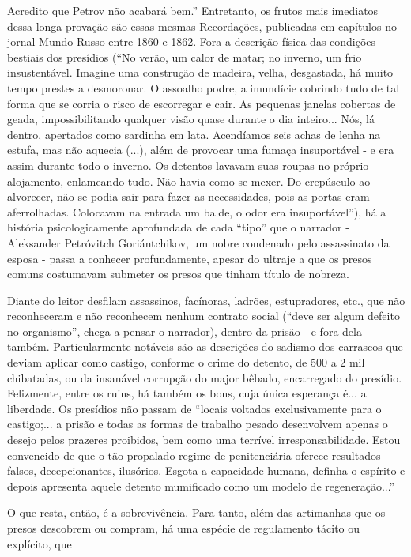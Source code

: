 Acredito que Petrov não acabará bem.'' Entretanto, os frutos mais
imediatos dessa longa provação são essas mesmas Recordações, publicadas
em capítulos no jornal Mundo Russo entre 1860 e 1862. Fora a descrição
física das condições bestiais dos presídios (``No verão, um calor de
matar; no inverno, um frio insustentável. Imagine uma construção de
madeira, velha, desgastada, há muito tempo prestes a desmoronar. O
assoalho podre, a imundície cobrindo tudo de tal forma que se corria o
risco de escorregar e cair. As pequenas janelas cobertas de geada,
impossibilitando qualquer visão quase durante o dia inteiro... Nós, lá
dentro, apertados como sardinha em lata. Acendíamos seis achas de lenha
na estufa, mas não aquecia (...), além de provocar uma fumaça
insuportável - e era assim durante todo o inverno. Os detentos lavavam
suas roupas no próprio alojamento, enlameando tudo. Não havia como se
mexer. Do crepúsculo ao alvorecer, não se podia sair para fazer as
necessidades, pois as portas eram aferrolhadas. Colocavam na entrada um
balde, o odor era insuportável''), há a história psicologicamente
aprofundada de cada ``tipo'' que o narrador - Aleksander Petróvitch
Goriántchikov, um nobre condenado pelo assassinato da esposa - passa a
conhecer profundamente, apesar do ultraje a que os presos comuns
costumavam submeter os presos que tinham título de nobreza.

Diante do leitor desfilam assassinos, facínoras, ladrões, estupradores,
etc., que não reconheceram e não reconhecem nenhum contrato social
(``deve ser algum defeito no organismo'', chega a pensar o narrador),
dentro da prisão - e fora dela também. Particularmente notáveis são as
descrições do sadismo dos carrascos que deviam aplicar como castigo,
conforme o crime do detento, de 500 a 2 mil chibatadas, ou da insanável
corrupção do major bêbado, encarregado do presídio. Felizmente, entre os
ruins, há também os bons, cuja única esperança é... a liberdade. Os
presídios não passam de ``locais voltados exclusivamente para o
castigo;... a prisão e todas as formas de trabalho pesado desenvolvem
apenas o desejo pelos prazeres proibidos, bem como uma terrível
irresponsabilidade. Estou convencido de que o tão propalado regime de
penitenciária oferece resultados falsos, decepcionantes, ilusórios.
Esgota a capacidade humana, definha o espírito e depois apresenta aquele
detento mumificado como um modelo de regeneração...''

O que resta, então, é a sobrevivência. Para tanto, além das artimanhas
que os presos descobrem ou compram, há uma espécie de regulamento tácito
ou explícito, que

